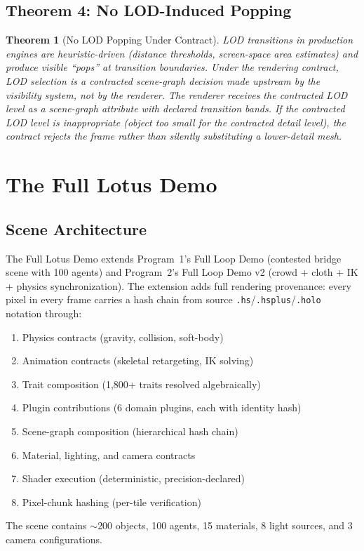 \documentclass[sigconf,nonacm]{acmart}
\newtheorem{theorem}{Theorem}
\begin{document}
\subsection{Theorem 4: No LOD-Induced Popping}
\begin{theorem}[No LOD Popping Under Contract]
LOD transitions in production engines are heuristic-driven
(distance thresholds, screen-space area estimates) and produce
visible ``pops'' at transition boundaries. Under the rendering
contract, LOD selection is a contracted scene-graph decision
made upstream by the visibility system, not by the renderer.
The renderer receives the contracted LOD level as a scene-graph
attribute with declared transition bands. If the contracted
LOD level is inappropriate (object too small for the contracted
detail level), the contract rejects the frame rather than
silently substituting a lower-detail mesh.
\end{theorem}

\section{The Full Lotus Demo}
\label{sec:demo}

\subsection{Scene Architecture}

The Full Lotus Demo extends Program~1's Full Loop Demo
(contested bridge scene with 100 agents) and Program~2's Full
Loop Demo v2 (crowd + cloth + IK + physics synchronization).
The extension adds full rendering provenance: every pixel in
every frame carries a hash chain from source
\texttt{.hs}/\texttt{.hsplus}/\texttt{.holo} notation through:
\begin{enumerate}
  \item Physics contracts (gravity, collision, soft-body)
  \item Animation contracts (skeletal retargeting, IK solving)
  \item Trait composition (1{,}800+ traits resolved algebraically)
  \item Plugin contributions (6 domain plugins, each with identity hash)
  \item Scene-graph composition (hierarchical hash chain)
  \item Material, lighting, and camera contracts
  \item Shader execution (deterministic, precision-declared)
  \item Pixel-chunk hashing (per-tile verification)
\end{enumerate}
The scene contains $\sim$200 objects, 100 agents, 15 materials,
8 light sources, and 3 camera configurations.
\end{document}
